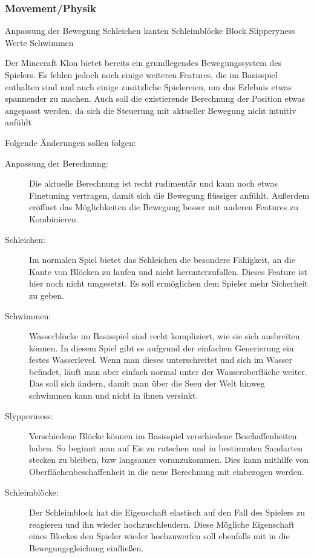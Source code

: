 \documentclass{article}
\begin{document}
\subsubsection{Movement/Physik}

Anpassung der Bewegung
Schleichen kanten
Schleimblöcke
Block Slipperyness Werte
Schwimmen

Der Minecraft Klon bietet bereits ein grundlegendes Bewegungssystem des Spielers. Es fehlen jedoch noch einige weiteren Features, die im Basisspiel enthalten sind und auch einige zusätzliche Spielereien, um das Erlebnis etwas spannender zu machen. Auch soll die existierende Berechnung der Position etwas angepasst werden, da sich die Steuerung mit aktueller Bewegung nicht intuitiv anfühlt

Folgende Änderungen sollen folgen:

\begin{description}
  \item[Anpassung der Berechnung:] Die aktuelle Berechnung ist recht rudimentär und kann noch etwas Finetuning vertragen, damit sich die Bewegung flüssiger anfühlt. Au\ss{}erdem eröffnet das Möglichkeiten die Bewegung besser mit anderen Features zu Kombinieren.
  \item[Schleichen:] Im normalen Spiel bietet das Schleichen die besondere Fähigkeit, an die Kante von Blöcken zu laufen und nicht herunterzufallen. Dieses Feature ist hier noch nicht umgesetzt. Es soll ermöglichen dem Spieler mehr Sicherheit zu geben.
  \item[Schwimmen:] Wasserblöcke im Basisspiel sind recht kompliziert, wie sie sich ausbreiten können. In diesem Spiel gibt es aufgrund der einfachen Generierung ein festes Wasserlevel. Wenn man dieses unterschreitet und sich im Wasser befindet, läuft man aber einfach normal unter der Wasseroberfläche weiter. Das soll sich ändern, damit man über die Seen der Welt hinweg schwimmen kann und nicht in ihnen versinkt.
  \item[Slypperiness:] Verschiedene Blöcke können im Basisspiel verschiedene Beschaffenheiten haben. So beginnt man auf Eis zu rutschen und in bestimmten Sandarten stecken zu bleiben, bzw langsamer voranzukommen. Dies kann mithilfe von Oberflächenbeschaffenheit in die neue Berechnung mit einbezogen werden.
  \item[Schleimblöcke:] Der Schleimblock hat die Eigenschaft elastisch auf den Fall des Spielers zu reagieren und ihn wieder hochzuschleudern. Diese Mögliche Eigenschaft eines Blockes den Spieler wieder hochzuwerfen soll ebenfalls mit in die Bewegungsgleichung einflie\ss{}en.
\end{description}
\end{document}
